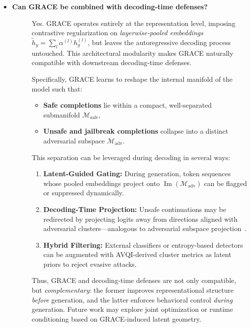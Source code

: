 \begin{itemize}[leftmargin=15pt,nolistsep]
\item[\ding{93}] { \selectfont \textbf{Can GRACE be combined with decoding-time defenses?}}
\begin{description}
\item[]
Yes. GRACE operates entirely at the representation level, imposing contrastive regularization on \textit{layerwise-pooled embeddings} \(\tilde{h}_y = \sum_l \alpha^{(l)} h_y^{(l)}\), but leaves the autoregressive decoding process untouched. This architectural modularity makes GRACE naturally compatible with downstream decoding-time defenses.

Specifically, GRACE learns to reshape the internal manifold of the model such that:
\begin{itemize}
    \item \textbf{Safe completions} lie within a compact, well-separated submanifold \(\mathcal{M}_{\text{safe}}\),
    \item \textbf{Unsafe and jailbreak completions} collapse into a distinct adversarial subspace \(\mathcal{M}_{\text{adv}}\).
\end{itemize}
This separation can be leveraged during decoding in several ways:
\begin{enumerate}[label=(\roman*), leftmargin=1.5em]
\item \textbf{Latent-Guided Gating:} During generation, token sequences whose pooled embeddings project onto \(\operatorname{Im}(\mathcal{M}_{\text{adv}})\) can be flagged or suppressed dynamically.
\item \textbf{Decoding-Time Projection:} Unsafe continuations may be redirected by projecting logits away from directions aligned with adversarial clusters—analogous to adversarial subspace projection~\citep{andriushchenko2022towards}.
\item \textbf{Hybrid Filtering:} External classifiers or entropy-based detectors~\citep{xu2021detecting} can be augmented with AVQI-derived cluster metrics as latent priors to reject evasive attacks.
\end{enumerate}

Thus, GRACE and decoding-time defenses are not only compatible, but \textit{complementary}: the former improves representational structure \textit{before} generation, and the latter enforces behavioral control \textit{during} generation. Future work may explore joint optimization or runtime conditioning based on GRACE-induced latent geometry.

\end{description}


\end{itemize}
